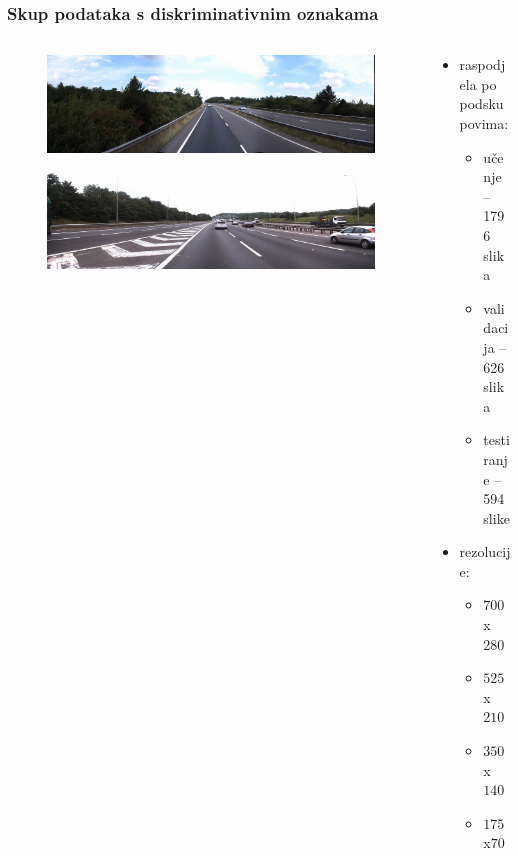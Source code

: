 \documentclass{beamer}
\begin{document}
\begin{frame}

\frametitle{Skup podataka s diskriminativnim oznakama}

\begin{columns}
\begin{column}{0.6\textwidth}
\begin{figure}[H]
\centering
\includegraphics[scale=0.14]{images/discriminative_negative.jpg}
\end{figure} 

\begin{figure}[H]
\centering
\includegraphics[scale=0.14]{images/discriminative_positive.jpg}
\end{figure} 
\end{column}
\begin{column}{0.4\textwidth}
\begin{itemize}
  \item raspodjela po podskupovima:
  \begin{itemize}
   \item učenje -- 1796 slika
   \item validacija -- 626 slika
   \item testiranje -- 594 slike
  \end{itemize}
  \item rezolucije:
  \begin{itemize}
   \item $700$x$280$
   \item $525$x$210$
   \item $350$x$140$
   \item $175$x$70$
  \end{itemize}

 \end{itemize}
\end{column}

\end{columns}
\end{frame}
\end{document}
